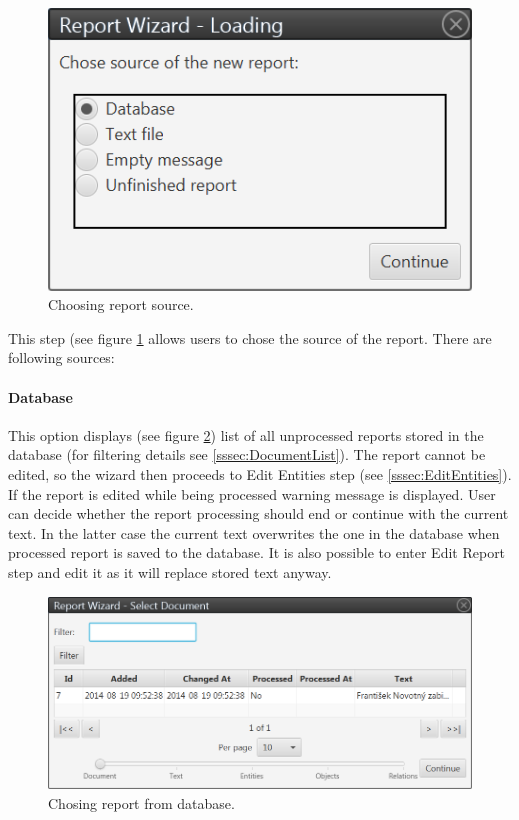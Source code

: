 \documentclass[12pt,a4paper]{report}
\begin{document}
\begin{figure}[!htb]
        \centering
        \includegraphics{Images/source}
        \caption{Choosing report source.}
        \label{fig:Source}
\end{figure}

This step (see figure \ref{fig:Source} allows users to chose the source of the
report. There are following sources:

\paragraph{Database} This option displays (see figure \ref{fig:Database}) list
of all unprocessed reports stored in the database (for filtering details see
\ref{sssec:DocumentList}).
The report cannot be edited, so the wizard then proceeds to Edit Entities step
(see \ref{sssec:EditEntities}). If the report is edited while being processed
warning message is displayed. User can decide whether the report processing
should end or continue with the current text. In the latter case the current
text overwrites the one in the database when processed report is saved to the
database. It is also possible to enter Edit Report step and edit it as it will
replace stored text anyway.

\begin{figure}[!htb]
        \centering
        \includegraphics[width=\textwidth]{Images/database}
        \caption{Chosing report from database.}
        \label{fig:Database}
\end{figure}
\end{document}
